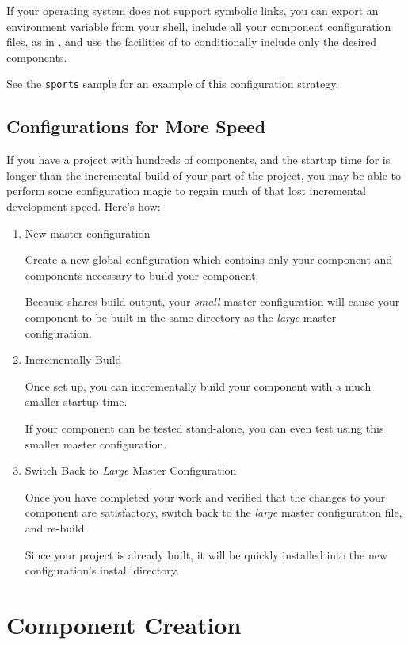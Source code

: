 If your operating system does not support symbolic links, you can
export an environment variable from your shell, include all your
component configuration files, as in , and use
the facilities of \gnumake to conditionally include only the desired
components.

See the \texttt{sports} sample for an example of this configuration
strategy.

\subsection{Configurations for More Speed}

If you have a project with hundreds of components, and the startup
time for \lmsbw is longer than the incremental build of your part of
the project, you may be able to perform some configuration magic to
regain much of that lost incremental development speed.  Here's how:

\begin{enumerate}
\item New master configuration

  Create a new global configuration which contains only your component
  and components necessary to build your component.

  Because \lmsbw shares build output, your \emph{small} master
  configuration will cause your component to be built in the same
  directory as the \emph{large} master configuration.

\item Incrementally Build

  Once set up, you can incrementally build your component with a much
  smaller startup time.

  If your component can be tested stand-alone, you can even test using
  this smaller master configuration.

\item Switch Back to \emph{Large} Master Configuration

  Once you have completed your work and verified that the changes to
  your component are satisfactory, switch back to the \emph{large}
  master configuration file, and re-build.

  Since your project is already built, it will be quickly installed
  into the new configuration's install directory.

\end{enumerate}

\section{Component Creation}\label{wrap:component-creation}

